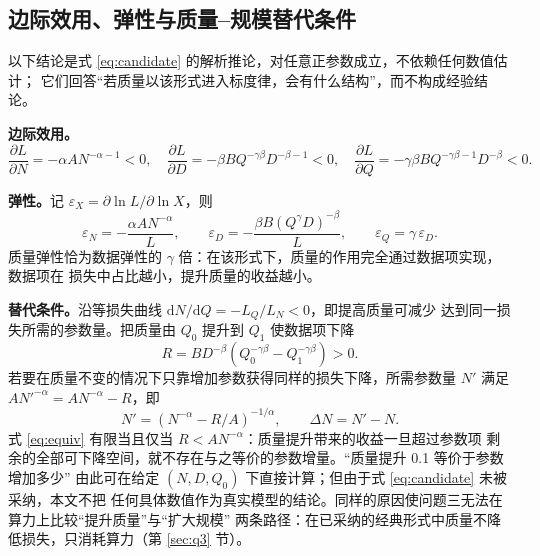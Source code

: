 \subsection{边际效用、弹性与质量–规模替代条件}

以下结论是式 \eqref{eq:candidate} 的解析推论，对任意正参数成立，不依赖任何数值估计；
它们回答“若质量以该形式进入标度律，会有什么结构”，而不构成经验结论。

\textbf{边际效用。}
\begin{equation}
  \frac{\partial L}{\partial N}=-\alpha A N^{-\alpha-1}<0,\quad
  \frac{\partial L}{\partial D}=-\beta B Q^{-\gamma\beta}D^{-\beta-1}<0,\quad
  \frac{\partial L}{\partial Q}=-\gamma\beta B Q^{-\gamma\beta-1}D^{-\beta}<0 .
\end{equation}

\textbf{弹性。}记 $\varepsilon_X=\partial\ln L/\partial\ln X$，则
\begin{equation}
  \varepsilon_N=-\frac{\alpha A N^{-\alpha}}{L},\qquad
  \varepsilon_D=-\frac{\beta B (Q^{\gamma}D)^{-\beta}}{L},\qquad
  \varepsilon_Q=\gamma\,\varepsilon_D .
\end{equation}
质量弹性恰为数据弹性的 $\gamma$ 倍：在该形式下，质量的作用完全通过数据项实现，数据项在
损失中占比越小，提升质量的收益越小。

\textbf{替代条件。}沿等损失曲线 $\mathrm{d}N/\mathrm{d}Q=-L_Q/L_N<0$，即提高质量可减少
达到同一损失所需的参数量。把质量由 $Q_0$ 提升到 $Q_1$ 使数据项下降
\begin{equation}
  R=B D^{-\beta}\left(Q_0^{-\gamma\beta}-Q_1^{-\gamma\beta}\right)>0 .
\end{equation}
若要在质量不变的情况下只靠增加参数获得同样的损失下降，所需参数量 $N'$ 满足
$A N'^{-\alpha}=A N^{-\alpha}-R$，即
\begin{equation}
  N'=\left(N^{-\alpha}-R/A\right)^{-1/\alpha},\qquad
  \Delta N=N'-N .
  \label{eq:equiv}
\end{equation}
式 \eqref{eq:equiv} 有限当且仅当 $R<A N^{-\alpha}$：质量提升带来的收益一旦超过参数项
剩余的全部可下降空间，就不存在与之等价的参数增量。“质量提升 0.1 等价于参数增加多少”
由此可在给定 $(N,D,Q_0)$ 下直接计算；但由于式 \eqref{eq:candidate} 未被采纳，本文不把
任何具体数值作为真实模型的结论。同样的原因使问题三无法在算力上比较“提升质量”与“扩大规模”
两条路径：在已采纳的经典形式中质量不降低损失，只消耗算力（第 \ref{sec:q3} 节）。
